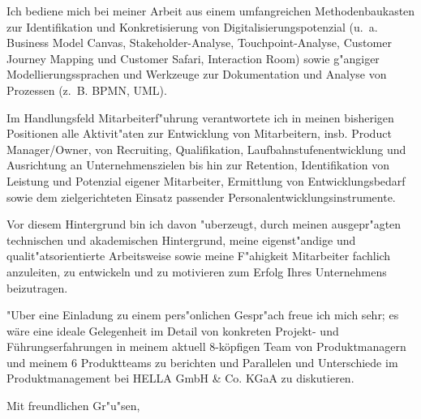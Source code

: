 \documentclass[10pt,a4paper]{dinbrief}
\begin{document}
\begin{letter}
Ich bediene mich bei meiner Arbeit aus einem umfangreichen Methodenbaukasten zur Identifikation und Konkretisierung von Digitalisierungspotenzial (u.~a. Business Model Canvas, Stakeholder-Analyse, Touchpoint-Analyse, Customer Journey Mapping und Customer Safari, Interaction Room) sowie g"angiger Modellierungssprachen und Werkzeuge zur Dokumentation und Analyse von Prozessen (z.~B. BPMN, UML).

Im Handlungsfeld Mitarbeiterf"uhrung verantwortete ich in meinen bisherigen Positionen alle Aktivit"aten zur Entwicklung von Mitarbeitern, insb. Product Manager/Owner, von Recruiting, Qualifikation, Laufbahnstufenentwicklung und Ausrichtung an Unternehmenszielen bis hin zur Retention, Identifikation von Leistung und Potenzial eigener Mitarbeiter, Ermittlung von Entwicklungsbedarf sowie dem zielgerichteten Einsatz passender Personalentwicklungsinstrumente.

Vor diesem Hintergrund bin ich davon "uberzeugt, durch meinen ausgepr"agten technischen und akademischen Hintergrund, meine eigenst"andige und qualit"atsorientierte Arbeitsweise sowie meine F"ahigkeit Mitarbeiter fachlich anzuleiten, zu entwickeln und zu motivieren zum Erfolg Ihres Unternehmens beizutragen.

"Uber eine Einladung zu einem pers"onlichen Gespr"ach freue ich mich sehr; es wäre eine ideale Gelegenheit im Detail von konkreten Projekt- und Führungserfahrungen in meinem aktuell 8-köpfigen Team von Produktmanagern und meinem 6 Produktteams zu berichten und Parallelen und Unterschiede im Produktmanagement bei HELLA GmbH \& Co. KGaA zu diskutieren.

\closing{Mit freundlichen Gr"u"sen,}
\end{letter}
\end{document}
